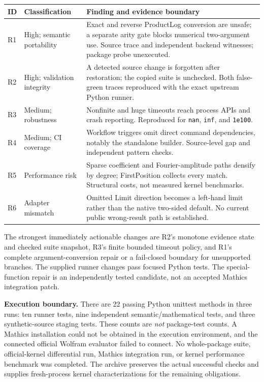 \documentclass[11pt,a4paper]{article}
\newcommand{\code}[1]{\texttt{#1}}
\begin{document}
{\small
\begin{longtable}{@{}L{0.075\textwidth}L{0.24\textwidth}L{0.59\textwidth}@{}}
\toprule
ID & Classification & Finding and evidence boundary\\
\midrule
\endhead
R1 & High; semantic portability & Exact and reverse ProductLog conversion are unsafe; a separate arity gate blocks numerical two-argument use. Source trace and independent backend witnesses; package probe unexecuted.\\
R2 & High; validation integrity & A detected source change is forgotten after restoration; the copied suite is unchecked. Both false-green traces reproduced with the exact upstream Python runner.\\
R3 & Medium; robustness & Nonfinite and huge timeouts reach process APIs and crash reporting. Reproduced for \code{nan}, \code{inf}, and \code{1e100}.\\
R4 & Medium; CI coverage & Workflow triggers omit direct command dependencies, notably the standalone builder. Source-level gap and independent pattern checks.\\
R5 & Performance risk & Sparse coefficient and Fourier-amplitude paths densify by degree; FirstPosition collects every match. Structural costs, not measured kernel benchmarks.\\
R6 & Adapter mismatch & Omitted Limit direction becomes a left-hand limit rather than the native two-sided default. No current public wrong-result path is established.\\
\bottomrule
\end{longtable}}


The strongest immediately actionable changes are R2's monotone evidence state and checked suite snapshot, R3's finite bounded timeout policy, and R1's complete argument-conversion repair or a fail-closed boundary for unsupported branches. The supplied runner changes pass focused Python tests. The special-function repair is an independently tested candidate, not an accepted Mathics integration patch.

\textbf{Execution boundary.} There are 22 passing Python unittest methods in three runs: ten runner tests, nine independent semantic/mathematical tests, and three synthetic-source staging tests. These counts are \emph{not} package-test counts. A Mathics installation could not be obtained in the execution environment, and the connected official Wolfram evaluator failed to connect. No whole-package suite, official-kernel differential run, Mathics integration run, or kernel performance benchmark was completed. The archive preserves the actual successful checks and supplies fresh-process kernel characterizations for the remaining obligations.
\end{document}
